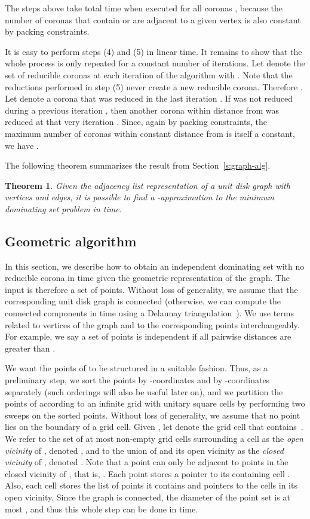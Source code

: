 \documentclass[preprint,12pt]{elsarticle}
\newtheorem{thm}{Theorem}
\begin{document}
The steps above take  total time when executed for all coronas , because the number of coronas that contain or are adjacent to a given vertex is also constant by packing constraints.

It is easy to perform steps (4) and (5) in linear time. It remains to show that the whole process is only repeated for a constant number of iterations. Let  denote the set of reducible coronas at each iteration of the algorithm with . Note that the reductions performed in step (5) never create a new reducible corona. Therefore . Let  denote a corona that was reduced in the last iteration . If  was not reduced during a previous iteration , then another corona within distance  from  was reduced at that very iteration . Since, again by packing constraints, the maximum number of coronas within constant distance from  is itself a constant, we have .

The following theorem summarizes the result from Section~\ref{s:graph-alg}.

\begin{thm} \label{thm:graph-alg}
Given the adjacency list representation of a unit disk graph with  vertices and  edges, it is possible to find a -approximation to the minimum dominating set problem in  time.
\end{thm}


\subsection{Geometric algorithm} \label{s:geo-alg}

In this section, we describe how to obtain an independent dominating set with no reducible corona in  time given the geometric representation of the graph. The input is therefore a set  of  points. Without loss of generality, we assume that the corresponding unit disk graph is connected (otherwise, we can compute the connected components in  time using a Delaunay triangulation~\cite{cg}). We use terms related to vertices of the graph and to the corresponding points interchangeably. For example, we say a set of points is independent if all pairwise distances are greater than .

We want the points of  to be structured in a suitable fashion. Thus, as a preliminary step, we sort the points by -coordinates and by -coordinates separately (such orderings will also be useful later on), and we partition the points of  according to an infinite grid with unitary square cells by performing two sweeps on the sorted points. Without loss of generality, we assume that no point lies on the boundary of a grid cell. Given , let  denote the grid cell that contains~. We refer to the set of at most  non-empty grid cells surrounding a cell  as the \emph{open vicinity} of , denoted , and to the union of  and its open vicinity as the \emph{closed vicinity} of , denoted . Note that a point  can only be adjacent to points in the closed vicinity of , that is, . Each point  stores a pointer to its containing cell . Also, each cell stores the list of points it contains and pointers to the cells in its open vicinity. 
Since the graph is connected, the diameter of the point set is at most , and thus this whole step can be done in  time.
\end{document}
